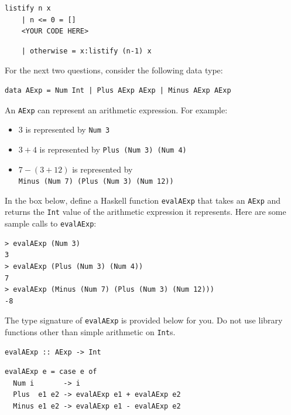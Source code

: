 \documentclass[addpoints]{exam}
\begin{document}
\begin{questions}
\begin{parts}
\begin{verbatim}
listify n x  
    | n <= 0 = []  
    <YOUR CODE HERE>
\end{verbatim}

\begin{solutionorbox}[1.5in]
\begin{verbatim}
    | otherwise = x:listify (n-1) x
\end{verbatim}
\end{solutionorbox}
\end{parts}

\newpage

For the next two questions, consider the following data type:

\begin{verbatim}
data AExp = Num Int | Plus AExp AExp | Minus AExp AExp
\end{verbatim}

\question[20] An \texttt{AExp} can represent an arithmetic expression.  For example:

\begin{itemize}
\item $3$ is represented by \texttt{Num 3}
\item $3 + 4$ is represented by \texttt{Plus (Num 3) (Num 4)}
\item $7 - (3 + 12)$ is represented by\\ \texttt{Minus (Num 7) (Plus (Num 3) (Num 12))}
\end{itemize}

In the box below, define a Haskell function \texttt{evalAExp} that takes an \texttt{AExp} and returns the \texttt{Int} value of the arithmetic expression it represents.  Here are some sample calls to \texttt{evalAExp}:

\begin{verbatim}
> evalAExp (Num 3)
3
> evalAExp (Plus (Num 3) (Num 4))
7
> evalAExp (Minus (Num 7) (Plus (Num 3) (Num 12)))
-8
\end{verbatim}

The type signature of \texttt{evalAExp} is provided below for you.  Do not use library functions other than simple arithmetic on \texttt{Int}s.

\begin{verbatim}
evalAExp :: AExp -> Int
\end{verbatim}
\begin{solutionorbox}[\stretch{1}]
\begin{verbatim}
evalAExp e = case e of
  Num i       -> i
  Plus  e1 e2 -> evalAExp e1 + evalAExp e2
  Minus e1 e2 -> evalAExp e1 - evalAExp e2
\end{verbatim}
\end{solutionorbox}


\end{questions}
\end{document}
